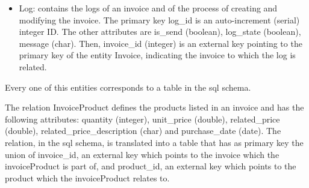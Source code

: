 \begin{itemize}
	\item Log: contains the logs of an invoice and of the process of creating and modifying the invoice. The primary key log\_id is an auto-increment (serial) integer ID. The other attributes are is\_send (boolean), log\_state (boolean), message (char). Then, invoice\_id (integer) is an external key pointing to the primary key of the entity Invoice, indicating the invoice to which the log is related.
\end{itemize}
Every one of this entities corresponds to a table in the sql schema.

The relation InvoiceProduct defines the products listed in an invoice and has the following attributes: quantity (integer), unit\_price (double), related\_price (double), related\_price\_description (char) and purchase\_date (date). The relation, in the sql schema, is translated into a table that has as primary key the union of invoice\_id, an external key which points to the invoice which the invoiceProduct is part of, and product\_id, an external key which points to the product which the invoiceProduct relates to.


